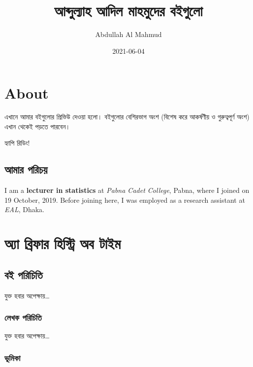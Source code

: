 \documentclass[
]{book}
\title{আব্দুল্যাহ আদিল মাহমুদের বইগুলো}
\author{Abdullah Al Mahmud}
\date{2021-06-04}
\begin{document}
\maketitle

{
\setcounter{tocdepth}{1}
\tableofcontents
}
\hypertarget{about}{%
\chapter*{About}\label{about}}

এখানে আমার বইগুলোর প্রিভিউ দেওয়া হলো। বইগুলোর বেশিরভাগ অংশ (বিশেষ করে আকর্ষণীয় ও গুরুত্বপূর্ণ অংশ) এখান থেকেই পড়তে পারবেন।

হ্যাপি রিডিং!

\hypertarget{me}{%
\section*{আমার পরিচয়}\label{me}}

I am a \textbf{lecturer in statistics} at \emph{Pabna Cadet College}, Pabna, where I joined on 19 October, 2019. Before joining here, I was employed as a research assistant at \emph{EAL}, Dhaka.

\hypertarget{abhot}{%
\chapter{অ্যা ব্রিফার হিস্ট্রি অব টাইম}\label{abhot}}

\hypertarget{abhot-book}{%
\section*{বই পরিচিতি}\label{abhot-book}}

যুক্ত হবার অপেক্ষায়\ldots{}

\hypertarget{abhot-author}{%
\subsection*{লেখক পরিচিতি}\label{abhot-author}}

যুক্ত হবার অপেক্ষায়\ldots{}

\hypertarget{abhot-intro}{%
\subsection*{ভূমিকা}\label{abhot-intro}}
\end{document}
